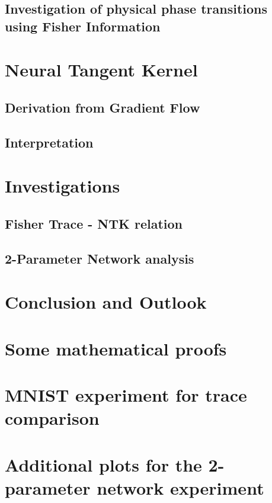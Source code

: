 \documentclass[12pt, twoside, a4paper]{report}
\begin{document}
	\section{Investigation of physical phase transitions using Fisher Information}\label{sec:FIPhysics}
	
	
	
	\chapter{Neural Tangent Kernel}\label{sec:ChapterNTK}
	
	\section{Derivation from Gradient Flow}\label{sec:NTKderivation}
	
	\section{Interpretation}\label{sec:NTKInterpretation}
	
	
	\chapter{Investigations}\label{sec:ChapterResults}
	
	\section{Fisher Trace - NTK relation}\label{sec:Results1}
	
	\section{2-Parameter Network analysis}\label{sec:Results2}
	
	
	\chapter{Conclusion and Outlook}\label{sec:ChapterConcAndOutlook}
	
	
	
	
	\nocite{*}
	\printbibliography[title=Literature]
	\begin{appendices}
		\chapter{Some mathematical proofs}
		
		\chapter{MNIST experiment for trace comparison}
		\label{sec:TraceExperimentAppendix}
		
		\chapter{Additional plots for the 2-parameter network experiment}\label{sec:2ParNetAppendix}
		
	\end{appendices}
	
\end{document}
